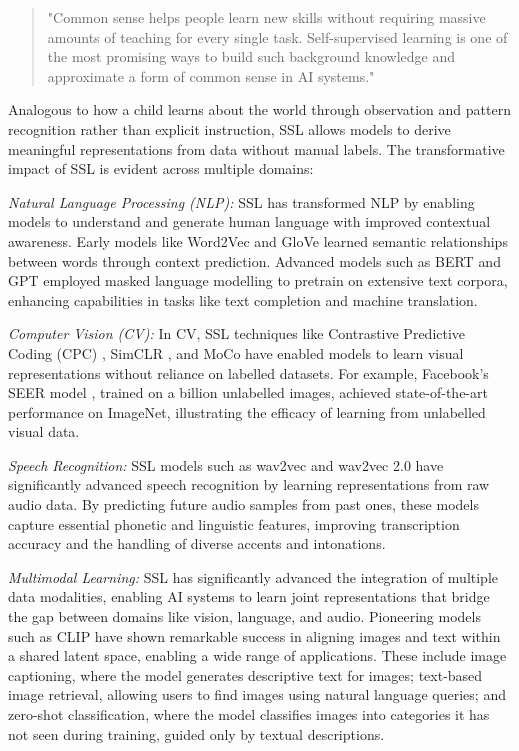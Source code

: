 \begin{quote}
    "Common sense helps people learn new skills without requiring massive amounts of teaching for every single task. Self-supervised learning is one of the most promising ways to build such background knowledge and approximate a form of common sense in AI systems."
\end{quote}

Analogous to how a child learns about the world through observation and pattern recognition rather than explicit instruction, SSL allows models to derive meaningful representations from data without manual labels. The transformative impact of SSL is evident across multiple domains:

\textit{Natural Language Processing (NLP):} SSL has transformed NLP by enabling models to understand and generate human language with improved contextual awareness. Early models like Word2Vec \citep{mikolov2013efficient} and GloVe \citep{pennington2014glove} learned semantic relationships between words through context prediction. Advanced models such as BERT \citep{devlin2019bert} and GPT \citep{radford2019language} employed masked language modelling to pretrain on extensive text corpora, enhancing capabilities in tasks like text completion and machine translation.

\textit{Computer Vision (CV):} In CV, SSL techniques like Contrastive Predictive Coding (CPC) \citep{oord2018representation}, SimCLR \citep{chen2020simple}, and MoCo \citep{he2020momentum} have enabled models to learn visual representations without reliance on labelled datasets. For example, Facebook's SEER model \citep{goyal2021self}, trained on a billion unlabelled images, achieved state-of-the-art performance on ImageNet, illustrating the efficacy of learning from unlabelled visual data.

\textit{Speech Recognition:} SSL models such as wav2vec \citep{schneider2019wav2vec} and wav2vec 2.0 \citep{baevski2020wav2vec} have significantly advanced speech recognition by learning representations from raw audio data. By predicting future audio samples from past ones, these models capture essential phonetic and linguistic features, improving transcription accuracy and the handling of diverse accents and intonations.

\textit{Multimodal Learning:} SSL has significantly advanced the integration of multiple data modalities, enabling AI systems to learn joint representations that bridge the gap between domains like vision, language, and audio. Pioneering models such as CLIP \citep{radford2021learning} have shown remarkable success in aligning images and text within a shared latent space, enabling a wide range of applications. These include image captioning, where the model generates descriptive text for images; text-based image retrieval, allowing users to find images using natural language queries; and zero-shot classification, where the model classifies images into categories it has not seen during training, guided only by textual descriptions.

